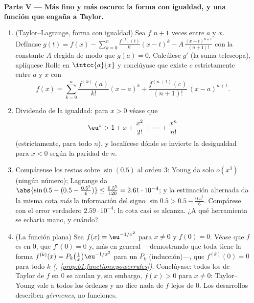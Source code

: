 \begin{problem}
\medskip
\noindent\textbf{Parte V --- Más fino y más oscuro: la forma con
igualdad, y una función que engaña a Taylor.}
\begin{enumerate}[resume]
  \item (Taylor--Lagrange, forma con igualdad) Sea $f$ $n + 1$
        veces  entre $a$ y $x$. Defínase
        $g(t) = f(x) - \sum_{k=0}^{n} \frac{f^{(k)}(t)}{k!}(x - t)^k
        - A\,\frac{(x-t)^{n+1}}{(n+1)!}$ con la constante $A$
        elegida de modo que $g(a) = 0$. Calcúlese $g'$ (la suma
        telescopa), aplíquese Rolle en $\intcc{a}{x}$ y conclúyase
        que existe $c$ estrictamente entre $a$ y $x$ con
        \[
        f(x) = \sum_{k=0}^{n} \frac{f^{(k)}(a)}{k!}(x-a)^k
        + \frac{f^{(n+1)}(c)}{(n+1)!}\,(x-a)^{n+1} .
        \]
  \item Dividendo de la igualdad: para $x > 0$ véase que
        \[
        \eu^x > 1 + x + \frac{x^2}{2!} + \dots +
        \frac{x^n}{n!}
        \]
        (estrictamente, para todo $n$), y localícese dónde se
        invierte la desigualdad para $x < 0$ según la paridad
        de $n$.
  \item Compárense los restos sobre $\sin(0.5)$ al orden $3$: Young
        da solo $o(x^3)$ (ningún número); Lagrange da
        $\abs{\sin 0.5 - (0.5 - \frac{0.5^3}{6})} \leq
        \frac{0.5^5}{120} = 2.61\cdot10^{-4}$; y la estimación
        alternada da la misma cota \emph{más} la información del
        signo $\sin 0.5 > 0.5 - \frac{0.5^3}{6}$. Compárese con el
        error verdadero $2.59\cdot10^{-4}$: la cota casi se alcanza.
        ¿A qué herramienta se echaría mano, y cuándo?
  \item (La función plana) Sea $f(x) = \eu^{-1/x^2}$ para
        $x \neq 0$ y $f(0) = 0$. Véase que $f$ es  en $0$,
        que $f'(0) = 0$ y, más en general ---demostrando que toda
         tiene la forma
        $f^{(k)}(x) = P_k\bigl(\frac1x\bigr)\eu^{-1/x^2}$ para un
         $P_k$ (inducción)---, que $f^{(k)}(0) = 0$ para
        todo $k$ \emph{(,
        \cref{prop:b1:functions:powerrules})}. Conclúyase: todos los
         de Taylor de $f$ en $0$ se anulan y, sin embargo,
        $f(x) > 0$ para $x \neq 0$: Taylor--Young vale a todos los
        órdenes y no dice nada de $f$ lejos de $0$. Los desarrollos
        describen \emph{gérmenes}, no funciones.
\end{enumerate}


\end{problem}
